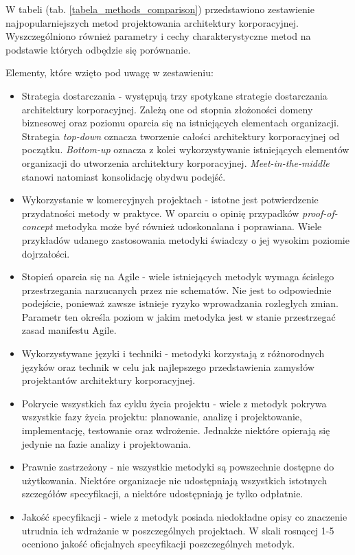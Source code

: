 W tabeli (tab. \ref{tabela_methods_comparison}) przedstawiono zestawienie najpopularniejszych metod projektowania architektury korporacyjnej. Wyszczególniono również parametry i cechy charakterystyczne metod na podstawie których odbędzie się porównanie.

Elementy, które wzięto pod uwagę w zestawieniu:
\begin{itemize}
\item{Strategia dostarczania - występują trzy spotykane strategie dostarczania architektury korporacyjnej. Zależą one od stopnia złożoności domeny biznesowej oraz poziomu oparcia się na istniejących elementach organizacji. Strategia \emph{top-down} oznacza tworzenie całości architektury korporacyjnej od początku. \emph{Bottom-up} oznacza z kolei wykorzystywanie istniejących elementów organizacji do utworzenia architektury korporacyjnej. \emph{Meet-in-the-middle} stanowi natomiast konsolidację obydwu podejść. }
\item{Wykorzystanie w komercyjnych projektach - istotne jest potwierdzenie przydatności metody w praktyce. W oparciu o opinię przypadków \emph{proof-of-concept} metodyka może być również udoskonalana i poprawiana. Wiele przykładów udanego zastosowania metodyki świadczy o jej wysokim poziomie dojrzałości.}
\item{Stopień oparcia się na Agile - wiele istniejących metodyk wymaga ścisłego przestrzegania narzucanych przez nie schematów. Nie jest to odpowiednie podejście, ponieważ zawsze istnieje ryzyko wprowadzania rozległych zmian. Parametr ten określa poziom w jakim metodyka jest w stanie przestrzegać zasad manifestu Agile.}
\item{Wykorzystywane języki i techniki - metodyki korzystają z różnorodnych języków oraz technik w celu jak najlepszego przedstawienia zamysłów projektantów architektury korporacyjnej.}
\item{Pokrycie wszystkich faz cyklu życia projektu - wiele z metodyk pokrywa wszystkie fazy życia projektu: planowanie, analizę i projektowanie, implementację, testowanie oraz wdrożenie. Jednakże niektóre opierają się jedynie na fazie analizy i projektowania.}
\item{Prawnie zastrzeżony - nie wszystkie metodyki są powszechnie dostępne do użytkowania. Niektóre organizacje nie udostępniają wszystkich istotnych szczegółów specyfikacji, a niektóre udostępniają je tylko odpłatnie.}
\item{Jakość specyfikacji - wiele z metodyk posiada niedokładne opisy co znaczenie utrudnia ich wdrażanie w poszczególnych projektach. W skali rosnącej 1-5 oceniono jakość oficjalnych specyfikacji poszczególnych metodyk. }
\end{itemize}

